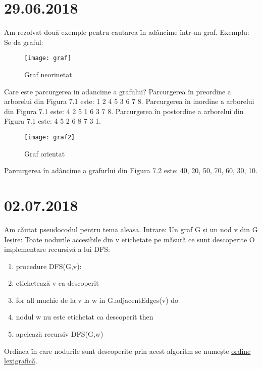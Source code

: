 \documentclass{report}
\begin{document}
\chapter{29.06.2018}
Am rezolvat două exemple pentru cautarea în adâncime  într-un graf.
Exemplu: 
Se da graful: \newline
\begin{figure}[ht]
\centering
\texttt{[image: graf]}
\caption{Graf neorinetat}
\end{figure}
Care este parcurgerea in adancime a grafului?\newline
Parcurgerea în preordine a arborelui din Figura 7.1 este: 1 2 4 5 3 6 7 8. \newline
Parcurgerea în inordine a arborelui din Figura 7.1 este: 4 2 5 1 6 3 7 8. \newline
Parcurgerea în postordine a arborelui din Figura 7.1 este: 4 5 2 6 8 7 3 1. 
\begin{figure}[ht]
\centering
\texttt{[image: graf2]}
\caption{Graf orientat}
\end{figure}
\newline
Parcurgerea în adâncime a grafurlui din Figura 7.2 este: 40, 20, 50, 70, 60, 30, 10.

\chapter{02.07.2018}
Am căutat pseudocodul pentru tema aleasa.\newline
\hspace*{0.5cm}Intrare: Un graf G și un nod v din G\newline
\hspace*{0.5cm}Ieșire: Toate nodurile accesibile din v etichetate pe măsură ce sunt descoperite\newline
\hspace*{0.5cm}O implementare recursivă a lui DFS:\newline
\begin{enumerate}
\item procedure DFS(G,v):
\item  etichetează v ca descoperit
\item  for all muchie de la v la w in G.adjacentEdges(v) do
\item    \hspace*{1cm} nodul w nu este etichetat ca descoperit then
\item     \hspace{1cm}apelează recursiv DFS(G,w)
\end{enumerate}
\hspace*{0.5cm}Ordinea în care nodurile sunt descoperite prin acest algoritm se numește \underline{ordine lexigrafică}.
\end{document}
